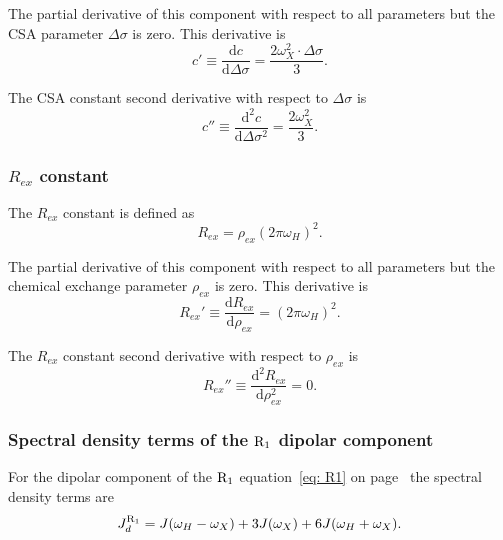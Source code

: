 \noindent The partial derivative of this component with respect to all parameters but the CSA parameter $\Delta\sigma$ is zero.
This derivative is
\begin{equation}
    c' \equiv \frac{\mathrm{d} c}{\mathrm{d} \Delta\sigma} = \frac{2 \omega_X^2 \cdot \Delta\sigma}{3}. \label{eq: Ri': c'}
\end{equation}

\noindent The CSA constant second derivative with respect to $\Delta\sigma$ is
\begin{equation}
    c'' \equiv \frac{\mathrm{d}^2 c}{\mathrm{d} \Delta\sigma^2} = \frac{2 \omega_X^2}{3}. \label{eq: Ri': c"}
\end{equation}


\subsubsection{$R_{ex}$ constant}

The $R_{ex}$ constant is defined as
\begin{equation}
    R_{ex} = \rho_{ex} (2 \pi \omega_H)^2 . \label{eq: Ri': Rex}
\end{equation}

\noindent The partial derivative of this component with respect to all parameters but the chemical exchange parameter $\rho_{ex}$ is zero.
This derivative is
\begin{equation}
    R_{ex}' \equiv \frac{\mathrm{d} R_{ex}}{\mathrm{d} \rho_{ex}} = (2 \pi \omega_H)^2. \label{eq: Ri': Rex'}
\end{equation}

\noindent The $R_{ex}$ constant second derivative with respect to $\rho_{ex}$ is
\begin{equation}
    R_{ex}'' \equiv \frac{\mathrm{d}^2 R_{ex}}{\mathrm{d} \rho_{ex}^2} = 0. \label{eq: Ri': Rex"}
\end{equation}


\subsubsection{Spectral density terms of the $\mathrm{R}_1$ dipolar component}

For the dipolar component of the $\mathrm{R}_1$ equation~\eqref{eq: R1} on page~\pageref{eq: R1} the spectral density terms are
\begin{equation}
    J_d^{\mathrm{R}_1} = J(\omega_H - \omega_X) + 3J(\omega_X) + 6J(\omega_H + \omega_X).  \label{eq: J terms: JR1d}
\end{equation}

